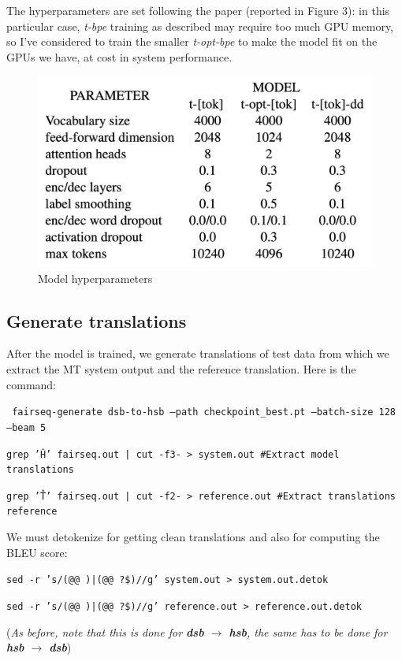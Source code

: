 \documentclass[12pt]{article}
\begin{document}
\newpage

The hyperparameters are set following the paper (reported in Figure 3):
in this particular case, \textit{t-bpe} training as described
may require too much GPU memory, so I've considered to train the smaller \textit{t-opt-bpe} to make the model fit on the GPUs we have, at cost in system performance.

\begin{figure}
    \centering
    \includegraphics[width=0.7\linewidth]{./figures/hyperparameters.png}
    \caption{Model hyperparameters}
    \label{fig:hyperparameters}
\end{figure}

\subsection{Generate translations}
After the model is trained, we generate translations of test data from which we extract the MT system output and the reference translation. Here is the command:

\vspace{0.2cm}
\texttt{
fairseq-generate dsb-to-hsb --path checkpoint\_best.pt --batch-size 128 --beam 5}

\vspace{0.2cm}
\texttt{grep '\^H' fairseq.out | cut -f3- > system.out \#Extract model translations}

\texttt{grep '\^T' fairseq.out | cut -f2- > reference.out \#Extract translations reference}

\vspace{0.2cm}
We must detokenize for getting clean translations and also for computing the BLEU score:

\vspace{0.2cm}
\texttt{sed -r 's/(@@ )|(@@ ?\$)//g' system.out > system.out.detok}

\texttt{sed -r 's/(@@ )|(@@ ?\$)//g' reference.out > reference.out.detok}

\vspace{0.2cm}
{\centering
(\textit{As before, note that this is done for \textbf{dsb} $\rightarrow$ \textbf{hsb}, the same has to be done for \textbf{hsb} $\rightarrow$ \textbf{dsb}})\par
}
\end{document}
